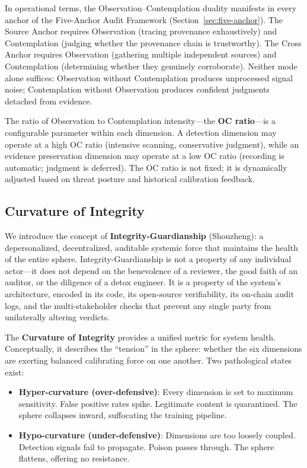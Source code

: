 \documentclass[11pt]{article}
\begin{document}
In operational terms, the Observation--Contemplation duality manifests in every 
anchor of the Five-Anchor Audit Framework (Section~\ref{sec:five-anchor}). The 
Source Anchor requires Observation (tracing provenance exhaustively) and 
Contemplation (judging whether the provenance chain is trustworthy). The Cross 
Anchor requires Observation (gathering multiple independent sources) and 
Contemplation (determining whether they genuinely corroborate). Neither mode alone 
suffices: Observation without Contemplation produces unprocessed signal noise; 
Contemplation without Observation produces confident judgments detached from 
evidence.

The ratio of Observation to Contemplation intensity---the \textbf{OC ratio}---is 
a configurable parameter within each dimension. A detection dimension may operate 
at a high OC ratio (intensive scanning, conservative judgment), while an evidence 
preservation dimension may operate at a low OC ratio (recording is automatic; 
judgment is deferred). The OC ratio is not fixed; it is dynamically adjusted based 
on threat posture and historical calibration feedback.

\subsection{Curvature of Integrity}

We introduce the concept of \textbf{Integrity-Guardianship} (Shouzheng): a 
depersonalized, decentralized, auditable systemic force that maintains the health 
of the entire sphere. Integrity-Guardianship is not a property of any individual 
actor---it does not depend on the benevolence of a reviewer, the good faith of an 
auditor, or the diligence of a detox engineer. It is a property of the system's 
architecture, encoded in its code, its open-source verifiability, its on-chain 
audit logs, and the multi-stakeholder checks that prevent any single party from 
unilaterally altering verdicts.

The \textbf{Curvature of Integrity} provides a unified metric for system health. 
Conceptually, it describes the ``tension'' in the sphere: whether the six dimensions 
are exerting balanced calibrating force on one another. Two pathological states exist:

\begin{itemize}
  \item \textbf{Hyper-curvature (over-defensive)}: Every dimension is set to maximum 
    sensitivity. False positive rates spike. Legitimate content is quarantined. 
    The sphere collapses inward, suffocating the training pipeline.
  \item \textbf{Hypo-curvature (under-defensive)}: Dimensions are too loosely coupled. 
    Detection signals fail to propagate. Poison passes through. The sphere 
    flattens, offering no resistance.
\end{itemize}
\end{document}
